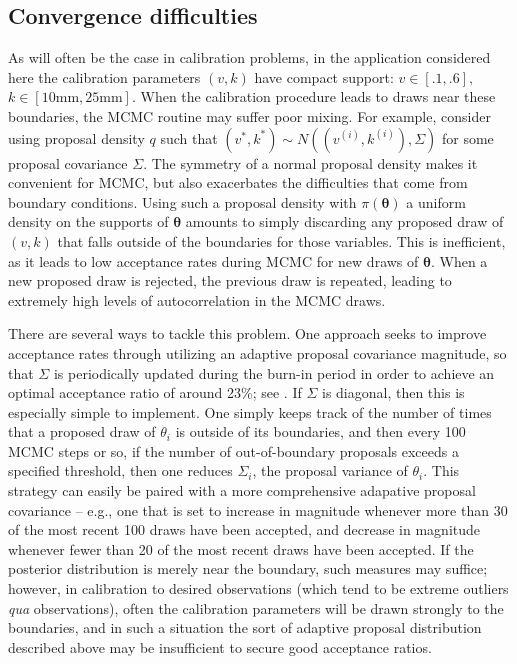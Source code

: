 \documentclass{article}
\begin{document}
\subsection{Convergence difficulties}\label{convergence_difficulties}
As will often be the case in calibration problems, in the application considered here the calibration parameters $(v,k)$ have compact support: $v\in [.1,.6],$ $k\in [10\mathrm{mm},25\mathrm{mm}]$. When the calibration procedure leads to draws near these boundaries, the MCMC routine may suffer poor mixing. For example, consider using proposal density $q$ such that $(v^*,k^*)\sim N((v^{(i)},k^{(i)}),\Sigma)$ for some proposal covariance $\Sigma$. The symmetry of a normal proposal density makes it convenient for MCMC, but also exacerbates the difficulties that come from boundary conditions. Using such a proposal density with $\pi(\boldsymbol \theta)$ a uniform density on the supports of $\boldsymbol \theta$ amounts to simply discarding any proposed draw of $(v,k)$ that falls outside of the boundaries for those variables. This is inefficient, as it leads to low acceptance rates during MCMC for new draws of $\boldsymbol \theta$. When a new proposed draw is rejected, the previous draw is repeated, leading to extremely high levels of autocorrelation in the MCMC draws.


There are several ways to tackle this problem. One approach seeks to improve acceptance rates through utilizing an adaptive proposal covariance magnitude, so that $\Sigma$ is periodically updated during the burn-in period in order to achieve an optimal acceptance ratio of around 23\%; see \cite{Roberts1997}. If $\Sigma$ is diagonal, then this is especially simple to implement. One simply keeps track of the number of times that a proposed draw of $\theta_i$ is outside of its boundaries, and then every 100 MCMC steps or so, if the number of out-of-boundary proposals exceeds a specified threshold, then one reduces $\Sigma_i$, the proposal variance of $\theta_i$. This strategy can easily be paired with a more comprehensive adapative proposal covariance -- e.g., one that is set to increase in magnitude whenever more than 30 of the most recent 100 draws have been accepted, and decrease in magnitude whenever fewer than 20 of the most recent draws have been accepted. If the posterior distribution is merely near the boundary, such measures may suffice; however, in calibration to desired observations (which tend to be extreme outliers \textit{qua} observations), often the calibration parameters will be drawn strongly to the boundaries, and in such a situation the sort of adaptive proposal distribution described above may be insufficient to secure good acceptance ratios. 
\end{document}
